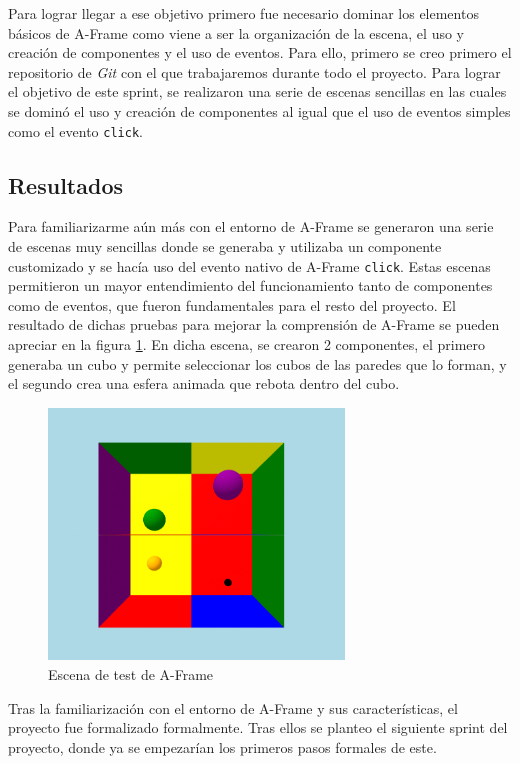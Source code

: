 \documentclass[a4paper, 12pt]{book}
\begin{document}
Para lograr llegar a ese objetivo primero fue necesario dominar los elementos básicos de A-Frame como viene a ser la organización de la escena, el uso y creación de componentes y el uso de eventos. 
Para ello, primero se creo primero el repositorio de \textit{Git}  con el que trabajaremos durante todo el proyecto. Para lograr el objetivo de este sprint, se realizaron una serie de escenas sencillas en las cuales se dominó el uso y creación de componentes al igual que el uso de eventos simples como el evento \texttt{click}.
\subsection{Resultados}
\label{subsec:resultados0}
Para familiarizarme aún más con el entorno de A-Frame se generaron una serie de escenas muy sencillas donde se generaba y utilizaba un componente customizado y se hacía uso del evento nativo de A-Frame \texttt{click}. Estas escenas permitieron un mayor entendimiento del funcionamiento tanto de componentes como de eventos, que fueron fundamentales para el resto del proyecto.
El resultado de dichas pruebas para mejorar la comprensión de A-Frame se pueden apreciar en la figura \ref{fig:sprint0}. En dicha escena, se crearon 2 componentes, el primero generaba un cubo y permite seleccionar los cubos de las paredes que lo forman, y el segundo crea una esfera animada que rebota dentro del cubo. 
\begin{figure}[H] 
  \centering
  \includegraphics[width=0.7\textwidth]{img/primera_escena.png} 
  \caption{Escena de test de A-Frame}
  \label{fig:sprint0}
\end{figure}

Tras la familiarización con el entorno de A-Frame y sus características, el proyecto fue formalizado formalmente. Tras ellos se planteo el siguiente sprint del proyecto, donde ya se empezarían los primeros pasos formales de este. 
\end{document}
